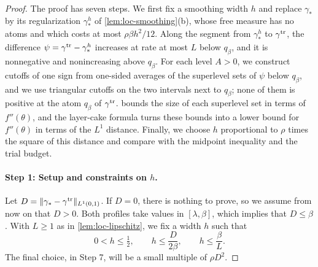 \begin{proof}
The proof has seven steps. We first fix a smoothing width $h$ and replace
$\gamma_*$ by its regularization $\gamma_*^h$ of \cref{lem:loc-smoothing}(b),
whose free measure has no atoms and which costs at most $\rho\beta h^2/12$. Along the segment
from $\gamma_*^h$ to $\gamma^{\rm tr}$, the difference
$\psi=\gamma^{\rm tr}-\gamma_*^h$ increases at rate at most $L$ below
$q_\beta$, and it is nonnegative and nonincreasing above $q_\beta$. For each
level $A>0$, we construct cutoffs of one sign from one-sided averages of the
superlevel sets of $\psi$ below $q_\beta$, and we use triangular cutoffs on the
two intervals next to $q_\beta$; none of them is positive at the atom
$q_\beta$ of $\gamma^{\rm tr}$.  bounds the size of
each superlevel set in terms of $f''(\theta)$, and the layer-cake formula
turns these bounds into a lower bound for $f''(\theta)$ in terms of the $L^1$
distance. Finally, we choose $h$ proportional to $\rho$ times the square of
this distance and compare with the midpoint inequality and the trial budget.

\paragraph{Step 1: Setup and constraints on $h$.}
Let $D=\|\gamma_*-\gamma^{\rm tr}\|_{L^1(0,1)}$. If $D=0$, there is nothing to
prove, so we assume from now on that $D>0$. Both profiles take values in
$[\lambda,\beta]$, which implies that $D\le\beta$. With $L\ge1$ as in
\cref{lem:loc-lipschitz}, we fix a width $h$ such that
\begin{equation}\label{eq:loc-h-constraints}
 0<h\le\tfrac12,\qquad h\le\frac{D}{2\beta},\qquad h\le\frac\beta L.
\end{equation}
The final choice, in Step 7, will be a small multiple of $\rho D^2$.


\end{proof}
